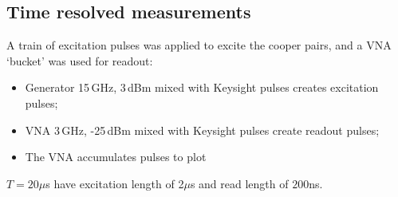  \subsection{Time resolved measurements}
  
  \noindent A train of excitation pulses was applied to excite the cooper pairs, and a VNA `bucket' was used for readout:
  \begin{itemize}
  	\item Generator 15\,GHz, 3\,dBm \ra mixed with Keysight pulses \ra creates excitation pulses;
  	\item VNA 3\,GHz, -25\,dBm \ra mixed with Keysight pulses \ra create readout pulses;
  	\item The VNA accumulates pulses to plot 
  \end{itemize}
	$ T = 20\mu$s have excitation length of 2$ \mu $s and read length of $ 200 $ns.
  
 
\newpage
